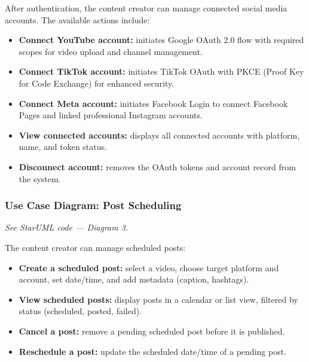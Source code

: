 After authentication, the content creator can manage connected social media accounts. The available actions include:
\begin{itemize}
    \item \textbf{Connect YouTube account:} initiates Google OAuth 2.0 flow with required scopes for video upload and channel management.
    \item \textbf{Connect TikTok account:} initiates TikTok OAuth with PKCE (Proof Key for Code Exchange) for enhanced security.
    \item \textbf{Connect Meta account:} initiates Facebook Login to connect Facebook Pages and linked professional Instagram accounts.
    \item \textbf{View connected accounts:} displays all connected accounts with platform, name, and token status.
    \item \textbf{Disconnect account:} removes the OAuth tokens and account record from the system.
\end{itemize}

\subsubsection*{Use Case Diagram: Post Scheduling}


\noindent\textit{See StarUML code --- Diagram 3.}

The content creator can manage scheduled posts:
\begin{itemize}
    \item \textbf{Create a scheduled post:} select a video, choose target platform and account, set date/time, and add metadata (caption, hashtags).
    \item \textbf{View scheduled posts:} display posts in a calendar or list view, filtered by status (scheduled, posted, failed).
    \item \textbf{Cancel a post:} remove a pending scheduled post before it is published.
    \item \textbf{Reschedule a post:} update the scheduled date/time of a pending post.
\end{itemize}

